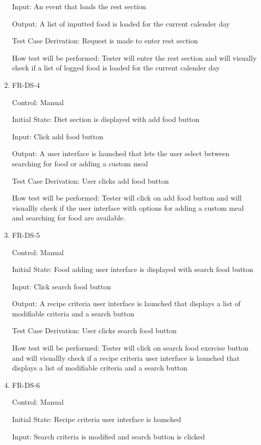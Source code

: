 \documentclass[12pt, titlepage]{article}
\begin{document}
\begin{enumerate}
	Input: An event that loads the rest section
	
	Output: A list of inputted food is loaded for the current calender day
	
	Test Case Derivation: Request is made to enter rest section
	
	How test will be performed: Tester will enter the rest section and will visually check if a list of logged food is loaded for the current calender day
	
	\item{FR-DS-4 \\}
	
	Control: Manual
	
	Initial State: Diet section is displayed with add food button
	
	Input: Click add food button
	
	Output: A user interface is launched that lets the user select between searching for food or adding a custom meal
	
	Test Case Derivation: User clicks add food button
	
	How test will be performed: Tester will click on add food button and will visuallly check if the user interface with options for adding a custom meal and searching for food are available.
	
	\item{FR-DS-5\\}
	
	Control: Manual
	
	Initial State: Food adding user interface is displayed with search food button
	
	Input: Click search food button
	
	Output: A recipe criteria user interface is launched that displays a list of modifiable criteria and a search button
	
	Test Case Derivation: User clicks search food button
	
	How test will be performed: Tester will click on search food exercise button and will visuallly check if a recipe criteria user interface is launched that displays a list of modifiable criteria and a search button
	
	\item{FR-DS-6\\}
	
	Control: Manual
	
	Initial State: Recipe criteria user interface is launched
	
	Input: Search criteria is modified and search button is clicked
	

\end{enumerate}
\end{document}

